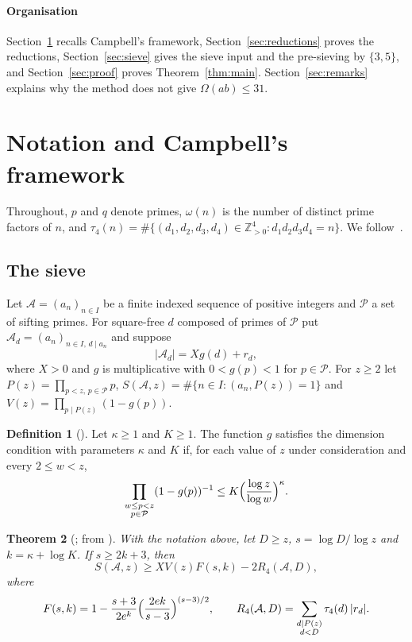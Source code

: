 \documentclass[preprint,11pt]{elsarticle}
\newtheorem{theorem}{Theorem}[section]
\theoremstyle{definition}
\newtheorem{definition}[theorem]{Definition}
\theoremstyle{remark}
\newcommand{\cA}{\mathcal{A}}
\newcommand{\cP}{\mathcal{P}}
\numberwithin{equation}{section}
\begin{document}
\paragraph{Organisation}
Section~\ref{sec:notation} recalls Campbell's framework,
Section~\ref{sec:reductions} proves the reductions, Section~\ref{sec:sieve}
gives the sieve input and the pre-sieving by $\{3,5\}$, and
Section~\ref{sec:proof} proves Theorem~\ref{thm:main}.
Section~\ref{sec:remarks} explains why the method does not give
$\Omega(ab)\le31$.

\section{Notation and Campbell's framework}\label{sec:notation}

Throughout, $p$ and $q$ denote primes, $\omega(n)$ is the number of distinct
prime factors of $n$, and
$\tau_4(n)=\#\{(d_1,d_2,d_3,d_4)\in\mathbb{Z}_{>0}^4:d_1d_2d_3d_4=n\}$.
We follow~\cite[\S\S2--3]{Campbell2026}.

\subsection{The sieve}
Let $\cA=(a_n)_{n\in I}$ be a finite indexed sequence of positive integers
and $\cP$ a set of sifting primes. For square-free $d$ composed of primes of
$\cP$ put $\cA_d=(a_n)_{n\in I,\,d\mid a_n}$ and suppose
\[
  |\cA_d| = Xg(d)+r_d,
\]
where $X>0$ and $g$ is multiplicative with $0<g(p)<1$ for $p\in\cP$. For
$z\ge2$ let $P(z)=\prod_{p<z,\,p\in\cP}p$,
$S(\cA,z)=\#\{n\in I:(a_n,P(z))=1\}$ and
$V(z)=\prod_{p\mid P(z)}(1-g(p))$.

\begin{definition}[{\cite[(2.1)]{Campbell2026}}]\label{def:dim}
Let $\kappa\ge1$ and $K\ge1$. The function $g$ satisfies the dimension
condition with parameters $\kappa$ and $K$ if, for each value of $z$ under
consideration and every $2\le w<z$,
\begin{equation}\label{eq:dim}
  \prod_{\substack{w\le p<z\\ p\in\cP}}(1-g(p))^{-1}
  \le K\Bigl(\frac{\log z}{\log w}\Bigr)^{\kappa}.
\end{equation}
\end{definition}

\begin{theorem}[{\cite[Theorem~2.1]{Campbell2026}; from \cite[Theorems~7.7 and~7.1]{FI2010}}]\label{thm:FI}
With the notation above, let $D\ge z$, $s=\log D/\log z$ and
$k=\kappa+\log K$. If $s\ge 2k+3$, then
\[
  S(\cA,z)\ge XV(z)F(s,k)-2R_4(\cA,D),
\]
where
\begin{equation}\label{eq:F}
  F(s,k)=1-\frac{s+3}{2e^{k}}\Bigl(\frac{2ek}{s-3}\Bigr)^{(s-3)/2},
  \qquad
  R_4(\cA,D)=\sum_{\substack{d\mid P(z)\\ d<D}}\tau_4(d)\,|r_d| .
\end{equation}
\end{theorem}
\end{document}
